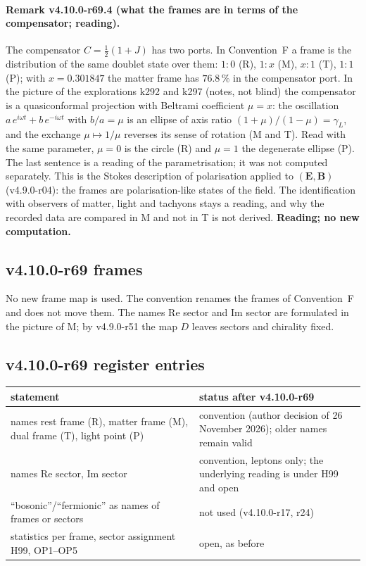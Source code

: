 \paragraph{Remark v4.10.0-r69.4 (what the frames are in terms of the compensator; reading).}
The compensator \(C=\tfrac12(1+J)\) has two ports.  In Convention~F a frame is the distribution of the same doublet state over them:
\(1:0\) (R), \(1:x\) (M), \(x:1\) (T), \(1:1\) (P); with \(x=0.301847\) the matter frame has \(76.8\,\%\) in the compensator port.  In the
picture of the explorations k292 and k297 (notes, not blind) the compensator is a quasiconformal projection with Beltrami coefficient
\(\mu=x\): the oscillation \(a\,e^{i\omega t}+b\,e^{-i\omega t}\) with \(b/a=\mu\) is an ellipse of axis ratio
\((1+\mu)/(1-\mu)=\gamma_L\), and the exchange \(\mu\mapsto1/\mu\) reverses its sense of rotation (M and T).  Read with the same parameter,
\(\mu=0\) is the circle (R) and \(\mu=1\) the degenerate ellipse (P).  The last sentence is a reading of the parametrisation; it was not
computed separately.  This is the Stokes description of polarisation applied to \((\mathbf E,\mathbf B)\) (v4.9.0-r04): the frames are
polarisation-like states of the field.  The identification with observers of matter, light and tachyons stays a reading, and why the
recorded data are compared in M and not in T is not derived.  \textbf{Reading; no new computation.}

\subsection*{v4.10.0-r69 frames}
\label{subsec:v4100-r69-frames}

No new frame map is used.  The convention renames the frames of Convention~F and does not move them.  The names Re sector and Im sector are
formulated in the picture of M; by v4.9.0-r51 the map \(D\) leaves sectors and chirality fixed.

\subsection*{v4.10.0-r69 register entries}
\label{subsec:v4100-r69-register}

\begin{center}
\small
\begin{tabular}{@{}>{\raggedright\arraybackslash}p{}>{\raggedright\arraybackslash}p{}@{}}
\toprule
statement & status after v4.10.0-r69\\
\midrule
names rest frame (R), matter frame (M), dual frame (T), light point (P) & convention (author decision of 26 November 2026); older names remain valid\\
names Re sector, Im sector & convention, leptons only; the underlying reading is under H99 and open\\
``bosonic''/``fermionic'' as names of frames or sectors & not used (v4.10.0-r17, r24)\\
statistics per frame, sector assignment H99, OP1--OP5 & open, as before\\
\bottomrule
\end{tabular}
\end{center}

